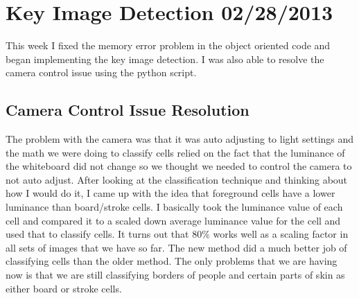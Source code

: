 \documentclass[]{article}
\begin{document}
	\tableofcontents
	\newpage
	\setcounter{page}{1}
	\thispagestyle{empty}
	
	
	\setlength{\parindent}{0pt}
	\setlength{\parskip}{6pt}
	
	\section{Key Image Detection 02/28/2013}
		This week I fixed the memory error problem in the object oriented code and began implementing the key image detection. I was also able to resolve the camera control issue using the python script.
		
		\subsection{Camera Control Issue Resolution}
			The problem with the camera was that it was auto adjusting to light settings and the math we were doing to classify cells relied on the fact that the luminance of the whiteboard did not change so we thought we needed to control the camera to not auto adjust. After looking at the classification technique and thinking about how I would do it, I came up with the idea that foreground cells have a lower luminance than board/stroke cells. I basically took the luminance value of each cell and compared it to a scaled down average luminance value for the cell and used that to classify cells. It turns out that 80\% works well as a scaling factor in all sets of images that we have so far. The new method did a much better job of classifying cells than the older method. The only problems that we are having now is that we are still classifying borders of people and certain parts of skin as either board or stroke cells.
			
\end{document}
